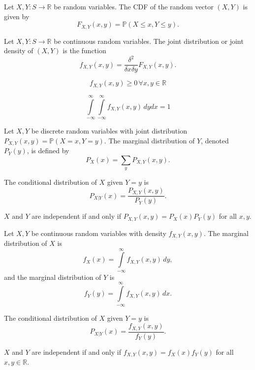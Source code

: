 \documentclass{article}
\begin{document}
\medskip
{}

    Let $X,Y:S\to\mathbb R$ be random variables. The CDF of the random vector $(X,Y)$ is given by $$F_{X,Y}(x, y) = \mathbb P(X\leq x, Y\leq y).$$

\medskip
{}

    Let $X,Y:S \to \mathbb R$ be continuous random variables. The joint distribution or joint density of $(X,Y)$ is the function $$f_{X,Y}(x, y) = \frac{\delta^2}{\delta x \delta y} F_{X,Y}(x,y).$$
    
    $$f_{X,Y}(x,y) \geq 0\,\forall x,y \in \mathbb R$$
    
    $$\int\limits_{-\infty}^\infty \int\limits_{-\infty}^\infty f_{X,Y}(x,y)\,dydx = 1$$

\medskip
{}

    Let $X, Y$ be discrete random variables with joint distribution $P_{X,Y}(x,y)=\mathbb P(X=x, Y=y)$. The marginal distribution of $Y$, denoted $P_Y(y)$, is defined by $$P_X(x) = \sum_{y}P_{X,Y}(x,y).$$

\medskip
{}

    The conditional distribution of $X$ given $Y=y$ is $$P_{X|Y}(x) = \frac{P_{X,Y}(x,y)}{P_Y(y)}.$$

\medskip
{}

    $X$ and $Y$ are independent if and only if $P_{X,Y}(x,y) = P_X(x)P_Y(y)$ for all $x,y$.

\medskip
{}

    Let $X,Y$ be continuous random variables with density $f_{X,Y}(x,y)$. The marginal distribution of $X$ is $$f_X(x) = \int\limits_{-\infty}^\infty f_{X,Y}(x,y)\,dy,$$ and the marginal distribution of $Y$ is $$f_Y(y) = \int\limits_{-\infty}^\infty f_{X,Y}(x,y)\,dx.$$

\medskip
{}

    The conditional distribution of $X$ given $Y=y$ is $$P_{X|Y}(x) = \frac{f_{X,Y}(x,y)}{f_Y(y)}.$$

\medskip
{}

    $X$ and $Y$ are independent if and only if $f_{X,Y}(x,y) = f_X(x)f_Y(y)$ for all $x,y \in \mathbb R$.
\end{document}
